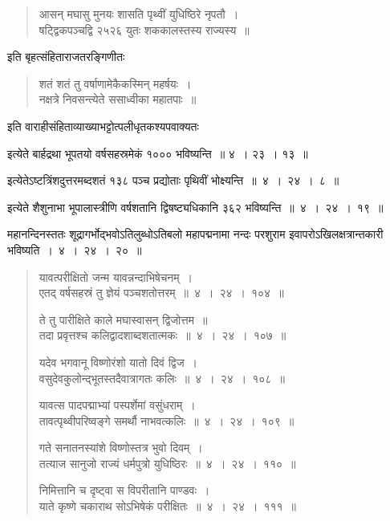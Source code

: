 \documentclass[11pt, openany]{book}
\begin{document}
\newpage

\begin{multicols}{2}
\begin{quote}
{\qt आसन् मघासु मुनयः शासति पृथ्वीं युधिष्ठिरे नृपतौ~।\\
षट्द्विकपञ्चद्वि २५२६ युतः शककालस्तस्य राज्यस्य~॥}
\end{quote}

\noindent
इति बृहत्संहिताराजतरङ्गिणीतः \textendash\

\begin{quote}
{\qt शतं शतं तु वर्षाणामेकैकस्मिन् महर्षयः~।\\
नक्षत्रे निवसन्त्येते ससाध्वीका महातपाः~॥}
\end{quote}

\noindent
इति वाराहीसंहिताव्याख्याभट्टोत्पलीधृतकश्यपवाक्यतः \textendash\ 

इत्येते बार्हद्रथा भूपतयो वर्षसहस्रमेकं १००० भविष्यन्ति~॥ ४~। २३~। १३~॥ 

इत्येतेऽष्टत्रिंशदुत्तरमब्दशतं १३८ पञ्च प्रद्योताः पृथिवीं भोक्ष्यन्ति~॥~४~।~२४~।~८~॥ 

इत्येते शैशुनाभा भूपालास्त्रीणि वर्षशतानि द्विषष्ट्यधिकानि ३६२ भविष्यन्ति~॥~४~।~२४~।~१९~॥

महानन्दिनस्ततः शूद्रागर्भोद्भवोऽतिलुब्धोऽतिबलो महापद्मनामा नन्दः परशुराम इवापरोऽखिलक्षत्रान्तकारी भविष्यति~।~४~।~२४~।~२०~॥

\begin{quote}
{\mbh यावत्परीक्षितो जन्म यावन्नन्दाभिषेचनम्~।\\
एतद् वर्षसहस्रं तु ज्ञेयं पञ्चशतोत्तरम्~॥~४~।~२४~।~१०४~॥

ते तु पारीक्षिते काले मघास्वासन् द्विजोत्तम~॥\\
तदा प्रवृत्तश्च कलिद्वादशाब्दशतात्मकः~॥~४~।~२४~।~१०७~॥

यदेव भगवानू विष्णोरंशो यातो दिवं द्विज~।\\
वसुदेवकुलोन्द्भूतस्तदैवात्रागतः कलिः~॥~४~।~२४~।~१०८~॥

यावत्स पादपद्माभ्यां पस्पर्शेमां वसुंधराम्~।\\
तावत्पृथ्वीपरिष्वङ्गे समर्थौ नाभवत्कलिः~॥~४~।~२४~।~१०९~॥

गते सनातनस्यांशे विष्णोस्तत्र भुवो दिवम्~।\\
तत्याज सानुजो राज्यं धर्मपुत्रो युधिष्ठिरः~॥~४~।~२४~।~११०~॥

निमित्तानि च दृष्ट्वा स विपरीतानि पाण्डवः~।\\
याते कृष्णे चकाराथ सोऽभिषेकं परीक्षितः~॥~४~।~२४~।~१११~॥}
\end{quote}


\end{multicols}
\end{document}
